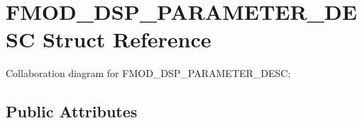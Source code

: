 \hypertarget{struct_f_m_o_d___d_s_p___p_a_r_a_m_e_t_e_r___d_e_s_c}{\section{F\+M\+O\+D\+\_\+\+D\+S\+P\+\_\+\+P\+A\+R\+A\+M\+E\+T\+E\+R\+\_\+\+D\+E\+S\+C Struct Reference}
\label{struct_f_m_o_d___d_s_p___p_a_r_a_m_e_t_e_r___d_e_s_c}
}


Collaboration diagram for F\+M\+O\+D\+\_\+\+D\+S\+P\+\_\+\+P\+A\+R\+A\+M\+E\+T\+E\+R\+\_\+\+D\+E\+S\+C\+:
\subsection*{Public Attributes}
